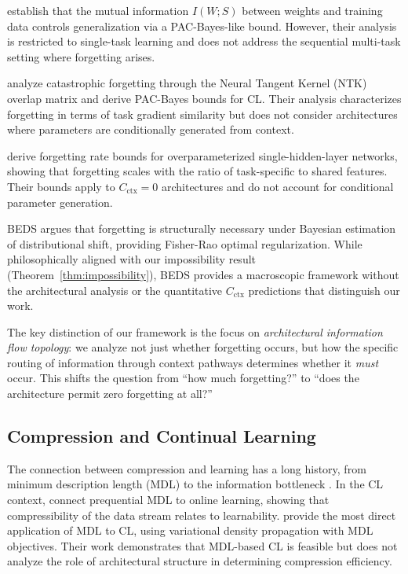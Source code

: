 \documentclass{article}
\begin{document}
\citet{achille2018emergence} establish that the mutual information $I(W; S)$ between weights and training data controls generalization via a PAC-Bayes-like bound. However, their analysis is restricted to single-task learning and does not address the sequential multi-task setting where forgetting arises.

\citet{doan2021theoretical} analyze catastrophic forgetting through the Neural Tangent Kernel (NTK) overlap matrix and derive PAC-Bayes bounds for CL. Their analysis characterizes forgetting in terms of task gradient similarity but does not consider architectures where parameters are conditionally generated from context.

\citet{taheri2025forgetting} derive forgetting rate bounds for overparameterized single-hidden-layer networks, showing that forgetting scales with the ratio of task-specific to shared features. Their bounds apply to $C_\mathrm{ctx} = 0$ architectures and do not account for conditional parameter generation.

BEDS \citep{caraffa2026beds} argues that forgetting is structurally necessary under Bayesian estimation of distributional shift, providing Fisher-Rao optimal regularization. While philosophically aligned with our impossibility result (Theorem~\ref{thm:impossibility}), BEDS provides a macroscopic framework without the architectural analysis or the quantitative $C_\mathrm{ctx}$ predictions that distinguish our work.

The key distinction of our framework is the focus on \emph{architectural information flow topology}: we analyze not just whether forgetting occurs, but how the specific routing of information through context pathways determines whether it \emph{must} occur. This shifts the question from ``how much forgetting?'' to ``does the architecture permit zero forgetting at all?''

\subsection{Compression and Continual Learning}

The connection between compression and learning has a long history, from minimum description length (MDL) \citep{rissanen1978modeling} to the information bottleneck \citep{tishby2000information}. In the CL context, \citet{bornschein2022neurocompositional} connect prequential MDL to online learning, showing that compressibility of the data stream relates to learnability. \citet{angelini2023variational} provide the most direct application of MDL to CL, using variational density propagation with MDL objectives. Their work demonstrates that MDL-based CL is feasible but does not analyze the role of architectural structure in determining compression efficiency.
\end{document}
